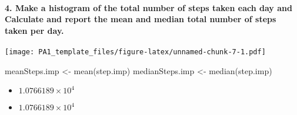 \documentclass[
]{article}
\newenvironment{Shaded}{\begin{snugshade}}{\end{snugshade}}
\newcommand{\AttributeTok}[1]{\textcolor[rgb]{0.77,0.63,0.00}{#1}}
\newcommand{\DecValTok}[1]{\textcolor[rgb]{0.00,0.00,0.81}{#1}}
\newcommand{\FunctionTok}[1]{\textcolor[rgb]{0.00,0.00,0.00}{#1}}
\newcommand{\NormalTok}[1]{#1}
\newcommand{\OtherTok}[1]{\textcolor[rgb]{0.56,0.35,0.01}{#1}}
\newcommand{\SpecialCharTok}[1]{\textcolor[rgb]{0.00,0.00,0.00}{#1}}
\newcommand{\StringTok}[1]{\textcolor[rgb]{0.31,0.60,0.02}{#1}}
\providecommand{\tightlist}{%
  \setlength{\itemsep}{0pt}\setlength{\parskip}{0pt}}
\begin{document}
\begin{Shaded}
\end{Shaded}

\hypertarget{make-a-histogram-of-the-total-number-of-steps-taken-each-day-and-calculate-and-report-the-mean-and-median-total-number-of-steps-taken-per-day.}{%
\paragraph{4. Make a histogram of the total number of steps taken each
day and Calculate and report the mean and median total number of steps
taken per
day.}\label{make-a-histogram-of-the-total-number-of-steps-taken-each-day-and-calculate-and-report-the-mean-and-median-total-number-of-steps-taken-per-day.}}

\begin{Shaded}
\end{Shaded}

\texttt{[image: PA1\_template\_files/figure-latex/unnamed-chunk-7-1.pdf]}

\begin{Shaded}
\begin{Highlighting}[]
\NormalTok{meanSteps.imp }\OtherTok{\textless{}{-}} \FunctionTok{mean}\NormalTok{(step.imp)}
\NormalTok{medianSteps.imp }\OtherTok{\textless{}{-}} \FunctionTok{median}\NormalTok{(step.imp)}
\end{Highlighting}
\end{Shaded}

\begin{itemize}
\tightlist
\item
  \ensuremath{1.0766189\times 10^{4}}
\item
  \ensuremath{1.0766189\times 10^{4}}
\end{itemize}
\end{document}
